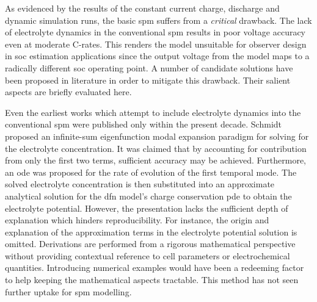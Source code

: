 
As  evidenced by  the  results of  the constant  current  charge, discharge  and
dynamic  simulation runs,  the basic  \gls{spm} suffers  from a  \emph{critical}
drawback. The lack of electrolyte dynamics in the conventional \gls{spm} results
in  poor voltage  accuracy  even at  moderate C-rates.  This  renders the  model
unsuitable for  observer design in  \gls{soc} estimation applications  since the
output voltage from the model maps  to a radically different \gls{soc} operating
point. A number of candidate solutions have been proposed in literature in order
to mitigate this drawback. Their salient aspects are briefly evaluated here.

Even  the earliest  works which  attempt  to include  electrolyte dynamics  into
the  conventional  \gls{spm} were  published  only  within the  present  decade.
Schmidt~\etal~\cite{Schmidt2010c} proposed  an infinite-sum  eigenfunction modal
expansion paradigm for solving for the electrolyte concentration. It was claimed
that by  accounting for contribution from  only the first two  terms, sufficient
accuracy may be achieved. Furthermore, an \gls{ode} was proposed for the rate of
evolution of  the first temporal  mode. The solved electrolyte  concentration is
then  substituted into  an  approximate analytical  solution  for the  \gls{dfn}
model's  charge conservation  \gls{pde}  to obtain the  electrolyte potential. However,  the presentation
lacks the  sufficient depth  of explanation  which hinders  reproducibility. For
instance,  the  origin  and  explanation  of  the  approximation  terms  in  the
electrolyte  potential solution  is omitted.  Derivations are  performed from  a
rigorous mathematical perspective without providing contextual reference to cell
parameters or  electrochemical quantities. Introducing numerical  examples would
have been a redeeming factor to help keeping the mathematical aspects tractable.
This method has not seen further uptake for \gls{spm} modelling.

